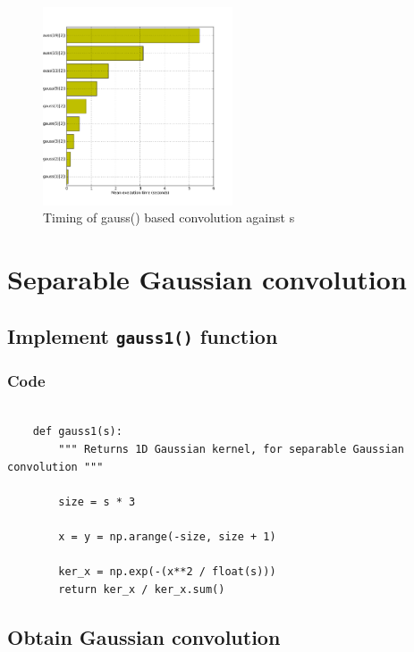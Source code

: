 \documentclass[abstract=true]{scrartcl}
\begin{document}
            \begin{figure}
              \centering
              \includegraphics[width=0.5\textwidth]{../images/3_time_gauss}
              \caption{Timing of gauss() based convolution against s}
              \label{timing1}
            \end{figure}


\section{Separable Gaussian convolution}

    \subsection{Implement \texttt{gauss1()} function}

        \subsubsection{Code}

            \begin{verbatim}

    def gauss1(s):
        """ Returns 1D Gaussian kernel, for separable Gaussian convolution """

        size = s * 3
        
        x = y = np.arange(-size, size + 1)
        
        ker_x = np.exp(-(x**2 / float(s)))
        return ker_x / ker_x.sum()    

            \end{verbatim}

    \subsection{Obtain Gaussian convolution}
\end{document}
